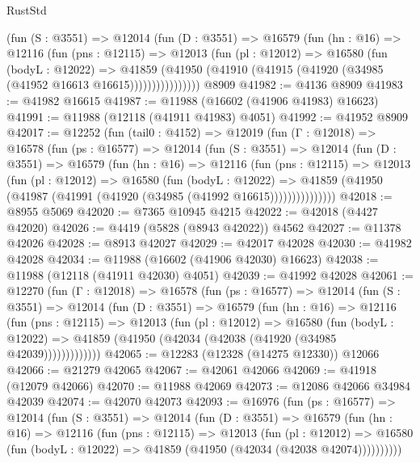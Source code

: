 \begin{lexlean}{RustStd}
\begin{coremodule}
            (fun (S : @3551) =>
            @12014
              (fun (D : @3551) =>
              @16579
                (fun (hn : @16) =>
                @12116
                  (fun (pns : @12115) =>
                  @12013
                    (fun (pl : @12012) =>
                    @16580
                      (fun (bodyL : @12022) =>
                      @41859
                        (@41950
                          (@41910 (@41915 (@41920 (@34985 (@41952 @16613 @16615))))))))))))))))
    @8909
@41982 := @4136 @8909
@41983 := @41982 @16615
@41987 := @11988 (@16602 (@41906 @41983) @16623)
@41991 := @11988 (@12118 (@41911 @41983) @4051)
@41992 := @41952 @8909
@42017 := @12252
    (fun (tail0 : @4152) =>
    @12019
      (fun (Γ : @12018) =>
      @16578
        (fun (ps : @16577) =>
        @12014
          (fun (S : @3551) =>
          @12014
            (fun (D : @3551) =>
            @16579
              (fun (hn : @16) =>
              @12116
                (fun (pns : @12115) =>
                @12013
                  (fun (pl : @12012) =>
                  @16580
                    (fun (bodyL : @12022) =>
                    @41859 (@41950 (@41987 (@41991 (@41920 (@34985 (@41992 @16615)))))))))))))))
@42018 := @8955 @5069
@42020 := @7365 @10945 @4215
@42022 := @42018 (@4427 @42020)
@42026 := @4419 (@5828 (@8943 @42022)) @4562
@42027 := @11378 @42026
@42028 := @8913 @42027
@42029 := @42017 @42028
@42030 := @41982 @42028
@42034 := @11988 (@16602 (@41906 @42030) @16623)
@42038 := @11988 (@12118 (@41911 @42030) @4051)
@42039 := @41992 @42028
@42061 := @12270
    (fun (Γ : @12018) =>
    @16578
      (fun (ps : @16577) =>
      @12014
        (fun (S : @3551) =>
        @12014
          (fun (D : @3551) =>
          @16579
            (fun (hn : @16) =>
            @12116
              (fun (pns : @12115) =>
              @12013
                (fun (pl : @12012) =>
                @16580
                  (fun (bodyL : @12022) =>
                  @41859 (@41950 (@42034 (@42038 (@41920 (@34985 @42039)))))))))))))
@42065 := @12283 (@12328 (@14275 @12330)) @12066
@42066 := @21279 @42065
@42067 := @42061 @42066
@42069 := @41918 (@12079 @42066)
@42070 := @11988 @42069
@42073 := @12086 @42066 @34984 @42039
@42074 := @42070 @42073
@42093 := @16976
    (fun (ps : @16577) =>
    @12014
      (fun (S : @3551) =>
      @12014
        (fun (D : @3551) =>
        @16579
          (fun (hn : @16) =>
          @12116
            (fun (pns : @12115) =>
            @12013
              (fun (pl : @12012) =>
              @16580 (fun (bodyL : @12022) => @41859 (@41950 (@42034 (@42038 @42074))))))))))

\end{coremodule}
\end{lexlean}
